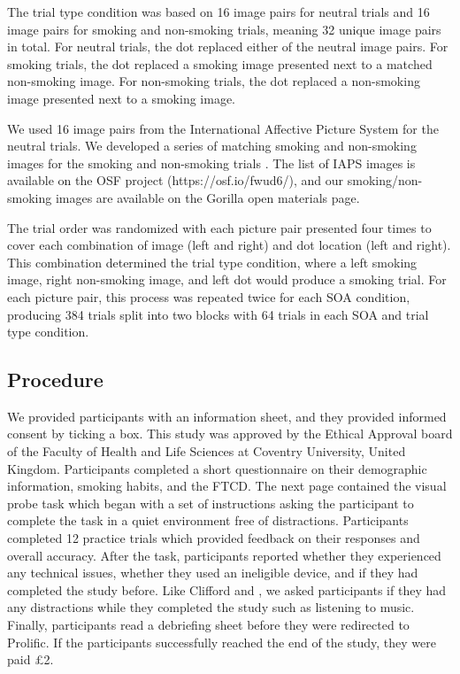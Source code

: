 \documentclass[empirical, authordate]{jote-new-article}
\begin{document}
The trial type condition was based on 16 image pairs for neutral trials and 16 image pairs for smoking and non-smoking trials, meaning 32 unique image pairs in total. For neutral trials, the dot replaced either of the neutral image pairs. For smoking trials, the dot replaced a smoking image presented next to a matched non-smoking image. For non-smoking trials, the dot replaced a non-smoking image presented next to a smoking image.

We used 16 image pairs from the International Affective Picture System \parencite{Lang2008} for the neutral trials. We developed a series of matching smoking and non-smoking images for the smoking and non-smoking trials \parencite{Bartlett2020}. The list of IAPS images is available on the OSF project (https://osf.io/fwud6/), and our smoking/non-smoking images are available on the Gorilla open materials page.

The trial order was randomized with each picture pair presented four times to cover each combination of image (left and right) and dot location (left and right). This combination determined the trial type condition, where a left smoking image, right non-smoking image, and left dot would produce a smoking trial. For each picture pair, this process was repeated twice for each SOA condition, producing 384 trials split into two blocks with 64 trials in each SOA and trial type condition.






















\subsection{Procedure}

We provided participants with an information sheet, and they provided informed consent by ticking a box. This study was approved by the Ethical Approval board of the Faculty of Health and Life Sciences at Coventry University, United Kingdom. Participants completed a short questionnaire on their demographic information, smoking habits, and the FTCD. The next page contained the visual probe task which began with a set of instructions asking the participant to complete the task in a quiet environment free of distractions. Participants completed 12 practice trials which provided feedback on their responses and overall accuracy. After the task, participants reported whether they experienced any technical issues, whether they used an ineligible device, and if they had completed the study before. Like Clifford and \parencite{Waechter2014}, we asked participants if they had any distractions while they completed the study such as listening to music. Finally, participants read a debriefing sheet before they were redirected to Prolific. If the participants successfully reached the end of the study, they were paid £2.
\end{document}
